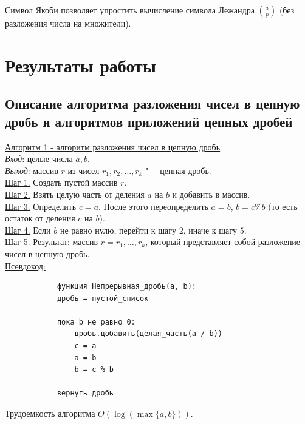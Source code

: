 \documentclass[bachelor, och, labwork]{shiza}
\begin{document}
        Символ Якоби позволяет упростить вычисление символа Лежандра
        $\left(\frac{a}{p}\right)$ (без разложения числа на множители).



\section{Результаты работы}

    \subsection{Описание алгоритма разложения чисел в цепную дробь и алгоритмов
    приложений цепных дробей}

        \underline{Алгоритм 1 - алгоритм разложения чисел в цепную дробь}\\
            \textit{Вход}: целые числа $a, b$.\\
            \textit{Выход}: массив $r$ из чисел $r_1, r_2, \dots, r_k$ "--- цепная дробь.\\
            \underline{Шаг 1.} Создать пустой массив $r$.\\
            \underline{Шаг 2.} Взять целую часть от деления $a$ на $b$ и добавить в массив.\\
            \underline{Шаг 3.} Определить $c = a$. После этого переопределить $a
            = b$, $b = c \% b$ (то есть остаток от деления $c$ на $b$).\\
            \underline{Шаг 4.} Если $b$ не равно нулю, перейти к шагу $2$, иначе
            к шагу $5$.\\
            \underline{Шаг 5.} Результат: массив $r = r_1, \dots, r_k$, который
            представляет собой разложение чисел в цепную дробь.\\
            
        \underline{Псевдокод:}
            \begin{verbatim}
            функция Непрерывная_дробь(a, b):
            дробь = пустой_список
            
            пока b не равно 0:
                дробь.добавить(целая_часть(a / b))
                c = a
                a = b
                b = c % b
            
            вернуть дробь                  
            \end{verbatim}

            Трудоемкость алгоритма $O(\log(\max\{a, b\}))$.\\
\end{document}
